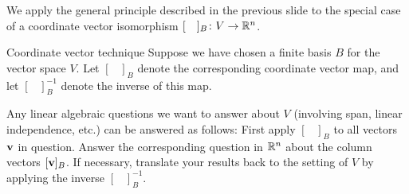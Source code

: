 \begin{frame}
We apply the general principle described in the previous slide to the special case of a coordinate vector isomorphism 
$[\hspace{10pt}]_B\colon V\rightarrow {\mathbb R}^n$. 
 \begin{block}{Coordinate vector technique} Suppose we have chosen a finite basis $B$ for the vector space $V$. 
 Let $[\hspace{10pt}]_B$ denote the corresponding coordinate vector map, and let $[\hspace{10pt}]_B^{-1}$ denote the inverse of this map.
 
 Any linear algebraic questions we want to answer about $V$ (involving span, linear independence, etc.) can be answered as follows: 
\bb
\ii First apply $[\hspace{10pt}]_B$ to all vectors ${\mathbf v}$ in question. 
\ii Answer the corresponding question in ${\mathbb R}^n$ about the column vectors $[{\mathbf v}]_B$. 
\ii If necessary, translate your results back to the setting of $V$ by applying the inverse $[\hspace{10pt}]_B^{-1}$. 
\ee
\end{block}

\end{frame}
